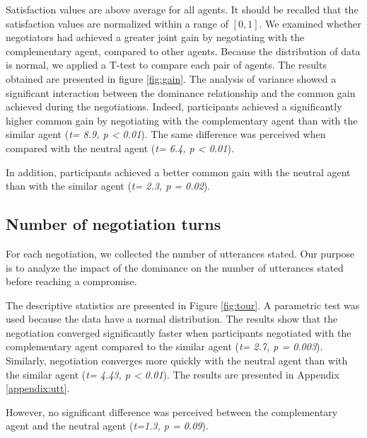 \documentclass{llncs}
\begin{document}
Satisfaction values are above average for all agents. It should be recalled that the satisfaction values are normalized within a range of $[0, 1] $. We examined whether negotiators had achieved a greater joint gain by negotiating with the complementary agent, compared to other agents. Because the  distribution of data is normal, we applied a T-test to compare each pair of agents. The results obtained are presented in figure \ref{fig:gain}. The analysis of variance showed a significant interaction between the dominance relationship and the common gain achieved during the negotiations. Indeed, participants achieved a significantly higher common gain by negotiating with the complementary agent than with the similar agent (\emph{t= 8.9, p < 0.01}). The same difference was perceived when compared with the neutral agent (\emph{t= 6.4, p < 0.01}).

In addition, participants achieved a better common gain with the neutral agent than with the similar agent (\emph{t= 2.3, p = 0.02}).

\subsection{Number of negotiation turns}

For each negotiation, we collected the number of utterances stated. Our purpose is to analyze the impact of the dominance on the number of utterances stated before reaching a compromise. 

The descriptive statistics are presented in Figure \ref{fig:tour}. A parametric test was used because the data have a normal distribution. The results show that the negotiation converged significantly faster when participants negotiated with the complementary agent compared to the similar agent (\emph{t= 2.7, p = 0.003}). Similarly, negotiation converges more quickly with the neutral agent than with the similar agent (\emph{t= 4.43, p < 0.01}).  The results are presented in Appendix \ref{appendix:utt}.

However, no significant difference was perceived between the complementary agent and the neutral agent (\emph{t=1.3, p = 0.09}).
\end{document}
